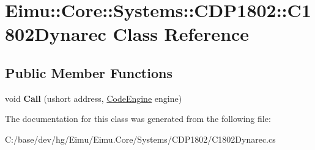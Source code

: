 \hypertarget{class_eimu_1_1_core_1_1_systems_1_1_c_d_p1802_1_1_c1802_dynarec}{
\section{Eimu::Core::Systems::CDP1802::C1802Dynarec Class Reference}
\label{class_eimu_1_1_core_1_1_systems_1_1_c_d_p1802_1_1_c1802_dynarec}
}
\subsection*{Public Member Functions}
\begin{DoxyCompactItemize}
\item 
\hypertarget{class_eimu_1_1_core_1_1_systems_1_1_c_d_p1802_1_1_c1802_dynarec_ab5ec26dc64b5205a7337533541c06a52}{
void {\bfseries Call} (ushort address, \hyperlink{class_eimu_1_1_core_1_1_systems_1_1_s_chip8_1_1_code_engine}{CodeEngine} engine)}
\label{class_eimu_1_1_core_1_1_systems_1_1_c_d_p1802_1_1_c1802_dynarec_ab5ec26dc64b5205a7337533541c06a52}

\end{DoxyCompactItemize}


The documentation for this class was generated from the following file:\begin{DoxyCompactItemize}
\item 
C:/base/dev/hg/Eimu/Eimu.Core/Systems/CDP1802/C1802Dynarec.cs\end{DoxyCompactItemize}
